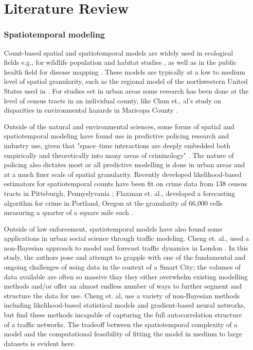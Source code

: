 
\chapter{Literature Review}
\label{literature_review}

\subsection{Spatiotemporal modeling}

Count-based spatial and spatiotemporal models are widely used in ecological fields e.g., for wildlife population and habitat studies \cite{cobi_2008}, as well as in the public health field for disease mapping \cite{schrodle_2011}. These models are typically at a low to medium level of spatial granularity, such as the regional model of the northwestern United States used in \cite{cobi_2008}. For studies set in urban areas some research has been done at the level of census tracts in an individual county, like Chun et., al's study on disparities in environmental hazards in Maricopa County \cite{chun_2012}. \par

Outside of the natural and environmental sciences, some forms of spatial and spatiotemporal modeling have found use in predictive policing research and industry use, given that "space–time interactions are deeply embedded both empirically and theoretically into many areas of criminology" \cite{li_2014}. The nature of policing also dictates most or all predictive modelling is done in urban areas and at a much finer scale of spatial granularity. Recently developed likelihood-based estimators for spatiotemporal counts have been fit on crime data from 138 census tracts in Pittsburgh, Pennyslyvania \cite{liesenfeld_2017}; Flaxman et. al., developed a forecasting algorithm for crime in Portland, Oregon at the granularity of 66,000 cells measuring a quarter of a square mile each \cite{flaxman_2018}.
 \par

Outside of law enforcement, spatiotemporal models have also found some applications in urban social science through traffic modeling. Cheng et. al., used a non-Bayesian approach to model and forecast traffic dynamics in London \cite{cheng_2012}. In this study, the authors pose and attempt to grapple with one of the fundamental and ongoing challenges of using data in the context of a Smart City; the volumes of data available are often so massive thay they either overwhelm existing modelling methods and/or offer an almost endless number of ways to further segment and structure the data for use. Cheng et. al, use a variety of non-Bayesian methods including likelihood-based statistical models and gradient-based neural networks, but find these methods incapable of capturing the full autocorrelation structure of a traffic networks. The tradeoff between the spatiotemporal complexity of a model and the computational feasibility of fitting the model in medium to large datasets is evident here. \par
